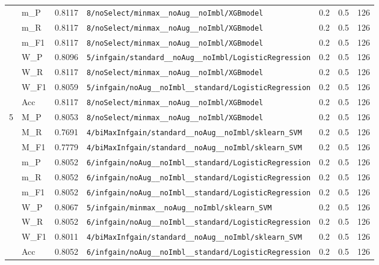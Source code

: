 \begin{table}[htbp]
\begin{tabular}{|c|l|c|>{\ttfamily\footnotesize}p{7.2cm}|c|c|c|}
 & m\_P & 0.8117 & \texttt{8/noSelect/minmax\_\_noAug\_\_noImbl/XGBmodel} & 0.2 & 0.5  & 126 \\ 
 & m\_R & 0.8117 & \texttt{8/noSelect/minmax\_\_noAug\_\_noImbl/XGBmodel} & 0.2 & 0.5  & 126 \\ 
 & m\_F1 & 0.8117 & \texttt{8/noSelect/minmax\_\_noAug\_\_noImbl/XGBmodel} & 0.2 & 0.5  & 126 \\ 
 & W\_P & 0.8096 & \texttt{5/infgain/standard\_\_noAug\_\_noImbl/LogisticRegression} & 0.2 & 0.5  & 126 \\ 
 & W\_R & 0.8117 & \texttt{8/noSelect/minmax\_\_noAug\_\_noImbl/XGBmodel} & 0.2 & 0.5  & 126 \\ 
 & W\_F1 & 0.8059 & \texttt{5/infgain/noAug\_\_noImbl\_\_standard/LogisticRegression} & 0.2 & 0.5  & 126 \\ 
 & Acc & 0.8117 & \texttt{8/noSelect/minmax\_\_noAug\_\_noImbl/XGBmodel} & 0.2 & 0.5  & 126 \\ 
\hline
\multirow{10}{*}{5} & M\_P & 0.8053 & \texttt{8/noSelect/minmax\_\_noAug\_\_noImbl/XGBmodel} & 0.2 & 0.5  & 126 \\ 
 & M\_R & 0.7691 & \texttt{4/biMaxInfgain/standard\_\_noAug\_\_noImbl/sklearn\_SVM} & 0.2 & 0.5  & 126 \\ 
 & M\_F1 & 0.7779 & \texttt{4/biMaxInfgain/standard\_\_noAug\_\_noImbl/sklearn\_SVM} & 0.2 & 0.5  & 126 \\ 
 & m\_P & 0.8052 & \texttt{6/infgain/noAug\_\_noImbl\_\_standard/LogisticRegression} & 0.2 & 0.5  & 126 \\ 
 & m\_R & 0.8052 & \texttt{6/infgain/noAug\_\_noImbl\_\_standard/LogisticRegression} & 0.2 & 0.5  & 126 \\ 
 & m\_F1 & 0.8052 & \texttt{6/infgain/noAug\_\_noImbl\_\_standard/LogisticRegression} & 0.2 & 0.5  & 126 \\ 
 & W\_P & 0.8067 & \texttt{5/infgain/minmax\_\_noAug\_\_noImbl/sklearn\_SVM} & 0.2 & 0.5  & 126 \\ 
 & W\_R & 0.8052 & \texttt{6/infgain/noAug\_\_noImbl\_\_standard/LogisticRegression} & 0.2 & 0.5  & 126 \\ 
 & W\_F1 & 0.8011 & \texttt{4/biMaxInfgain/standard\_\_noAug\_\_noImbl/sklearn\_SVM} & 0.2 & 0.5  & 126 \\ 
 & Acc & 0.8052 & \texttt{6/infgain/noAug\_\_noImbl\_\_standard/LogisticRegression} & 0.2 & 0.5  & 126 \\ 
\hline
\end{tabular}
\end{table}